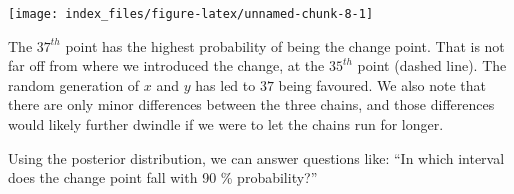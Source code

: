 \documentclass[]{article}
\newenvironment{Shaded}{\begin{snugshade}}{\end{snugshade}}
\newcommand{\KeywordTok}[1]{\textcolor[rgb]{0.13,0.29,0.53}{\textbf{#1}}}
\newcommand{\DataTypeTok}[1]{\textcolor[rgb]{0.13,0.29,0.53}{#1}}
\newcommand{\DecValTok}[1]{\textcolor[rgb]{0.00,0.00,0.81}{#1}}
\newcommand{\FloatTok}[1]{\textcolor[rgb]{0.00,0.00,0.81}{#1}}
\newcommand{\StringTok}[1]{\textcolor[rgb]{0.31,0.60,0.02}{#1}}
\newcommand{\OperatorTok}[1]{\textcolor[rgb]{0.81,0.36,0.00}{\textbf{#1}}}
\newcommand{\NormalTok}[1]{#1}
\begin{document}
\begin{Shaded}
\end{Shaded}

\texttt{[image: index\_files/figure-latex/unnamed-chunk-8-1]}

The \(37^{th}\) point has the highest probability of being the change
point. That is not far off from where we introduced the change, at the
\(35^{th}\) point (dashed line). The random generation of \(x\) and
\(y\) has led to \(37\) being favoured. We also note that there are only
minor differences between the three chains, and those differences would
likely further dwindle if we were to let the chains run for longer.

Using the posterior distribution, we can answer questions like: ``In
which interval does the change point fall with 90 \% probability?''

\begin{Shaded}
\end{Shaded}
\end{document}

